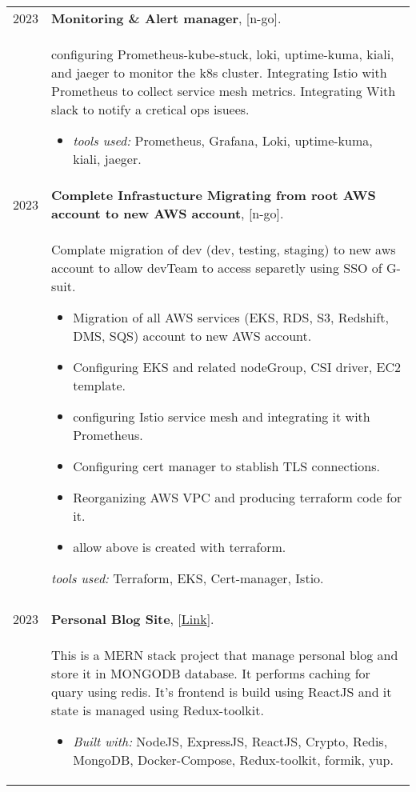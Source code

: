 \documentclass[a4paper,10pt]{article}
\begin{document}
\begin{longtable}{r p{16cm}}
        2023  & \textbf{Monitoring \& Alert manager}, [n-go].\\&
        configuring Prometheus-kube-stuck, loki, uptime-kuma, kiali, and jaeger to monitor the k8s cluster. Integrating Istio with Prometheus to collect service mesh metrics. Integrating With slack to notify a cretical ops isuees.
        \begin{itemize}
            \item \textit{tools used: } Prometheus, Grafana, Loki, uptime-kuma, kiali, jaeger.
        \end{itemize}\\

        2023  & \textbf{Complete Infrastucture Migrating from root AWS account to new AWS account}, [n-go].\\&
        Complate migration of dev (dev, testing, staging) to new aws account to allow devTeam to access separetly using SSO of G-suit. 
        \begin{itemize}
            \item  Migration of all AWS services (EKS, RDS, S3, Redshift, DMS, SQS) account to new AWS account.
            \item Configuring EKS and related nodeGroup, CSI driver, EC2 template.
            \item configuring Istio service mesh and integrating it with Prometheus. 
            \item Configuring cert manager to stablish TLS connections.
            \item Reorganizing AWS VPC and producing terraform code for it. 
            \item allow above is created with terraform.
        \end{itemize}
        \textit{tools used: } Terraform, EKS, Cert-manager, Istio.\\
        &\\
        2023  & \textbf{Personal Blog Site}, [\href{https://github.com/zaky-fetoh/Personal-Blog-Site}{Link}].\\&
        This is a MERN stack project that manage personal blog and store it in MONGODB database. It performs caching for quary using redis. It's frontend is build using ReactJS and it state is managed using Redux-toolkit.
        \begin{itemize}
            \item \textit{Built with: } NodeJS, ExpressJS,  ReactJS, Crypto, Redis, MongoDB, Docker-Compose, Redux-toolkit, formik, yup.
        \end{itemize}\\
        

\end{longtable}
\end{document}
